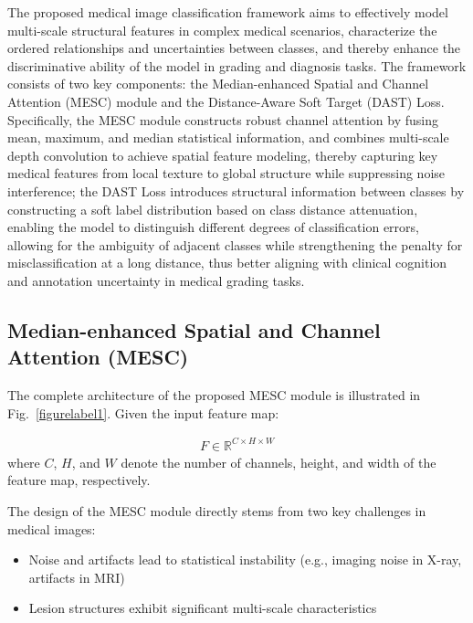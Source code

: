 \documentclass[letterpaper, 10 pt, conference]{ieeeconf}  %
\begin{document}
The proposed medical image classification framework aims to effectively model multi-scale structural features in complex medical scenarios, characterize the ordered relationships and uncertainties between classes, and thereby enhance the discriminative ability of the model in grading and diagnosis tasks. The framework consists of two key components: the Median-enhanced Spatial and Channel Attention (MESC) module and the Distance-Aware Soft Target (DAST) Loss. Specifically, the MESC module constructs robust channel attention by fusing mean, maximum, and median statistical information, and combines multi-scale depth convolution to achieve spatial feature modeling, thereby capturing key medical features from local texture to global structure while suppressing noise interference; the DAST Loss introduces structural information between classes by constructing a soft label distribution based on class distance attenuation, enabling the model to distinguish different degrees of classification errors, allowing for the ambiguity of adjacent classes while strengthening the penalty for misclassification at a long distance, thus better aligning with clinical cognition and annotation uncertainty in medical grading tasks.

\subsection{Median-enhanced Spatial and Channel Attention (MESC)}

The complete architecture of the proposed MESC module is illustrated in Fig.~\ref{figurelabel1}. Given the input feature map:

\begin{equation}
\begin{aligned}
    F \in \mathbb{R}^{C \times H \times W}
\end{aligned}
\end{equation}
where \(C\), \(H\), and \(W\) denote the number of channels, height, and width of the feature map, respectively.

The design of the MESC module directly stems from two key challenges in medical images:
\begin{itemize}
\item Noise and artifacts lead to statistical instability (e.g., imaging noise in X-ray, artifacts in MRI)
\item Lesion structures exhibit significant multi-scale characteristics
\end{itemize}
\end{document}
